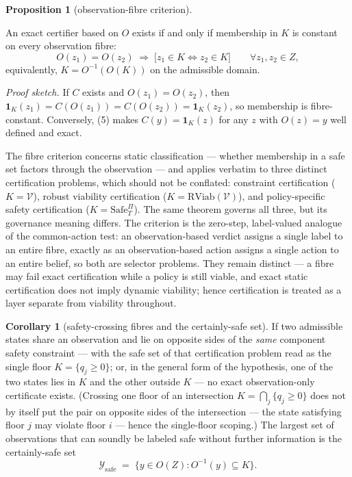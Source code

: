 \documentclass[10pt,twocolumn]{article}
\theoremstyle{definition}
\newtheorem{proposition}{Proposition}
\newtheorem{corollary}{Corollary}
\begin{document}
\begin{proposition}[observation-fibre criterion]\label{calc-prop:fibre}

An exact certifier
based on \(O\) exists if and only if membership in \(K\) is constant on
every observation fibre:
\[O(z_1) = O(z_2) \;\Longrightarrow\; \big[ z_1 \in K \iff z_2 \in K \big] \qquad \forall z_1, z_2 \in Z, \tag{5}\]
equivalently, \(K = O^{-1}(O(K))\) on the admissible domain.

\end{proposition}

\emph{Proof sketch.} If \(C\) exists and \(O(z_1) = O(z_2)\), then \(\mathbf{1}_K(z_1) = C(O(z_1)) = C(O(z_2)) = \mathbf{1}_K(z_2)\), so membership is fibre-constant. Conversely, (5) makes \(C(y) = \mathbf{1}_K(z)\) for any \(z\) with \(O(z) = y\) well defined and exact.

The fibre criterion concerns static classification --- whether
membership in a safe set factors through the observation --- and applies
verbatim to three distinct certification problems, which should not be
conflated: constraint certification (\(K = \mathcal{V}\)), robust
viability certification (\(K = \mathrm{RViab}(\mathcal{V})\)), and
policy-specific safety certification (\(K = \mathrm{Safe}^{\Pi}_T\)).
The same theorem governs all three, but its governance meaning differs.
The criterion is the zero-step, label-valued analogue of the
common-action test: an observation-based verdict assigns a single label
to an entire fibre, exactly as an observation-based action assigns a
single action to an entire belief, so both are selector problems. They
remain distinct --- a fibre may fail exact certification while a policy
is still viable, and exact static certification does not imply dynamic
viability; hence certification is treated as a layer separate from
viability throughout.

\begin{corollary}[safety-crossing fibres and the certainly-safe set]\label{calc-cor:certainly-safe} If two admissible states share an observation and lie on opposite
sides of the \emph{same} component safety constraint --- with the safe
set of that certification problem read as the single floor
\(K = \{ q_j \ge 0 \}\); or, in the general form of the hypothesis, one
of the two states lies in \(K\) and the other outside \(K\) --- no exact
observation-only certificate exists. (Crossing one floor of an
intersection \(K = \bigcap_j \{ q_j \ge 0 \}\) does not by itself put
the pair on opposite sides of the intersection --- the state satisfying
floor \(j\) may violate floor \(i\) --- hence the single-floor scoping.)
The largest set of observations that can soundly be labeled safe without
further information is the certainly-safe set
\[\mathcal{Y}_{\mathrm{safe}} \;=\; \big\{ y \in O(Z) : O^{-1}(y) \subseteq K \big\}.\]

\end{corollary}
\end{document}
